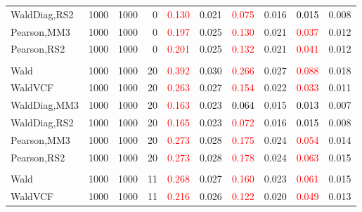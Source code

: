 \documentclass[
]{article}
\begin{document}
\begin{table}[H]
{\begin{tabular}[t]{lrrrrrrlrr}
\hspace{1em}WaldDiag,RS2 & 1000 & 1000 & 0 & \textcolor{red}{0.130} & 0.021 & \textcolor{red}{0.075} & 0.016 & \textcolor{black}{0.015} & 0.008\\
\hspace{1em}Pearson,MM3 & 1000 & 1000 & 0 & \textcolor{red}{0.197} & 0.025 & \textcolor{red}{0.130} & 0.021 & \textcolor{red}{0.037} & 0.012\\
\hspace{1em}Pearson,RS2 & 1000 & 1000 & 0 & \textcolor{red}{0.201} & 0.025 & \textcolor{red}{0.132} & 0.021 & \textcolor{red}{0.041} & 0.012\\
\addlinespace[0.3em]
\multicolumn{10}{l}{\textbf{1F 15V}}\\
\hspace{1em}Wald & 1000 & 1000 & 20 & \textcolor{red}{0.392} & 0.030 & \textcolor{red}{0.266} & 0.027 & \textcolor{red}{0.088} & 0.018\\
\hspace{1em}WaldVCF & 1000 & 1000 & 20 & \textcolor{red}{0.263} & 0.027 & \textcolor{red}{0.154} & 0.022 & \textcolor{red}{0.033} & 0.011\\
\hspace{1em}WaldDiag,MM3 & 1000 & 1000 & 20 & \textcolor{red}{0.163} & 0.023 & \textcolor{black}{0.064} & 0.015 & \textcolor{black}{0.013} & 0.007\\
\hspace{1em}WaldDiag,RS2 & 1000 & 1000 & 20 & \textcolor{red}{0.165} & 0.023 & \textcolor{red}{0.072} & 0.016 & \textcolor{black}{0.015} & 0.008\\
\hspace{1em}Pearson,MM3 & 1000 & 1000 & 20 & \textcolor{red}{0.273} & 0.028 & \textcolor{red}{0.175} & 0.024 & \textcolor{red}{0.054} & 0.014\\
\hspace{1em}Pearson,RS2 & 1000 & 1000 & 20 & \textcolor{red}{0.273} & 0.028 & \textcolor{red}{0.178} & 0.024 & \textcolor{red}{0.063} & 0.015\\
\addlinespace[0.3em]
\multicolumn{10}{l}{\textbf{2F 10V}}\\
\hspace{1em}Wald & 1000 & 1000 & 11 & \textcolor{red}{0.268} & 0.027 & \textcolor{red}{0.160} & 0.023 & \textcolor{red}{0.061} & 0.015\\
\hspace{1em}WaldVCF & 1000 & 1000 & 11 & \textcolor{red}{0.216} & 0.026 & \textcolor{red}{0.122} & 0.020 & \textcolor{red}{0.049} & 0.013\\

\end{tabular}}
\end{table}
\end{document}

